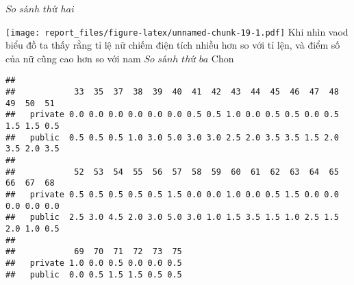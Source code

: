 \documentclass[
]{article}
\newenvironment{Shaded}{\begin{snugshade}}{\end{snugshade}}
\newcommand{\DataTypeTok}[1]{\textcolor[rgb]{0.13,0.29,0.53}{#1}}
\newcommand{\DecValTok}[1]{\textcolor[rgb]{0.00,0.00,0.81}{#1}}
\newcommand{\KeywordTok}[1]{\textcolor[rgb]{0.13,0.29,0.53}{\textbf{#1}}}
\newcommand{\NormalTok}[1]{#1}
\newcommand{\OperatorTok}[1]{\textcolor[rgb]{0.81,0.36,0.00}{\textbf{#1}}}
\newcommand{\StringTok}[1]{\textcolor[rgb]{0.31,0.60,0.02}{#1}}
\begin{document}
\(So\) \(sánh\) \(thứ\) \(hai\)

\begin{Shaded}
\end{Shaded}

\texttt{[image: report\_files/figure-latex/unnamed-chunk-19-1.pdf]} Khi
nhìn vaod biểu đồ ta thấy rằng tỉ lệ nữ chiếm điện tích nhiều hơn so với
tỉ lện, và điểm số của nữ cũng cao hơn so với nam \(So\) \(sánh\)
\(thứ\) \(ba\) Chon

\begin{Shaded}
\end{Shaded}

\begin{verbatim}
##          
##            33  35  37  38  39  40  41  42  43  44  45  46  47  48  49  50  51
##   private 0.0 0.0 0.0 0.0 0.0 0.0 0.5 0.5 1.0 0.0 0.5 0.5 0.0 0.5 1.5 1.5 0.5
##   public  0.5 0.5 0.5 1.0 3.0 5.0 3.0 3.0 2.5 2.0 3.5 3.5 1.5 2.0 3.5 2.0 3.5
##          
##            52  53  54  55  56  57  58  59  60  61  62  63  64  65  66  67  68
##   private 0.5 0.5 0.5 0.5 0.5 1.5 0.0 0.0 1.0 0.0 0.5 1.5 0.0 0.0 0.0 0.0 0.0
##   public  2.5 3.0 4.5 2.0 3.0 5.0 3.0 1.0 1.5 3.5 1.5 1.0 2.5 1.5 2.0 1.0 0.5
##          
##            69  70  71  72  73  75
##   private 1.0 0.0 0.5 0.0 0.0 0.5
##   public  0.0 0.5 1.5 1.5 0.5 0.5
\end{verbatim}

\begin{Shaded}
\end{Shaded}
\end{document}
